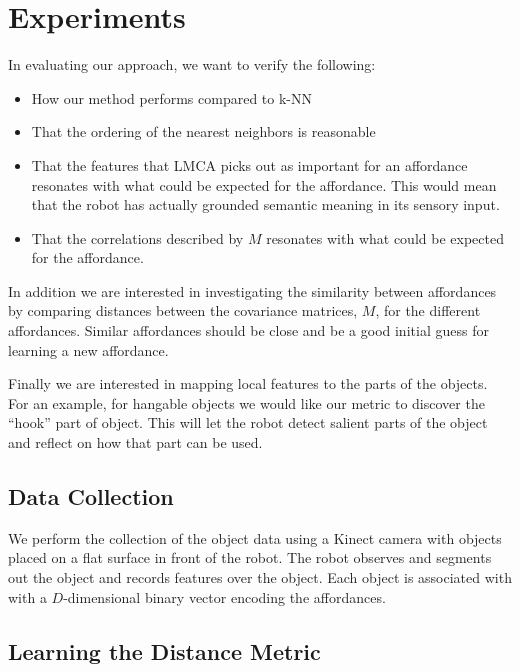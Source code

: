 \section{Experiments}\label{experiments}

In evaluating our approach, we want to verify the following:

\begin{itemize}
\tightlist
\item
  How our method performs compared to k-NN
\item
  That the ordering of the nearest neighbors is reasonable
\item
  That the features that LMCA picks out as important for an affordance
  resonates with what could be expected for the affordance. This would
  mean that the robot has actually grounded semantic meaning in its
  sensory input.
\item
  That the correlations described by \(M\) resonates with what could be
  expected for the affordance.
\end{itemize}

In addition we are interested in investigating the similarity between
affordances by comparing distances between the covariance matrices,
\(M\), for the different affordances. Similar affordances should be
close and be a good initial guess for learning a new affordance.

Finally we are interested in mapping local features to the parts of the
objects. For an example, for hangable objects we would like our metric
to discover the ``hook'' part of object. This will let the robot detect
salient parts of the object and reflect on how that part can be used.

\subsection{Data Collection}\label{data-collection}

We perform the collection of the object data using a Kinect camera with
objects placed on a flat surface in front of the robot. The robot
observes and segments out the object and records features over the
object. Each object is associated with with a \(D\)-dimensional binary
vector encoding the affordances.

\subsection{Learning the Distance
Metric}\label{learning-the-distance-metric}

